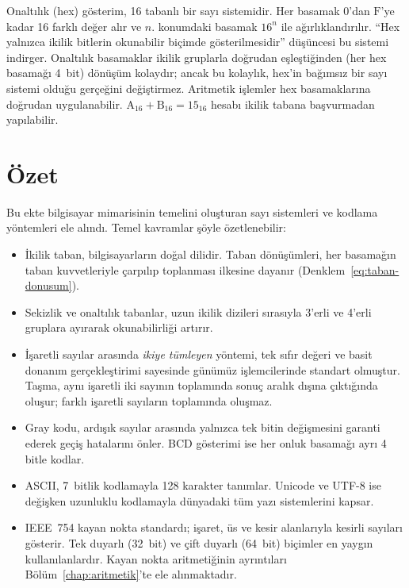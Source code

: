 Onaltılık (hex) gösterim, 16 tabanlı bir sayı sistemidir. Her basamak $0$'dan $\text{F}$'ye kadar 16 farklı değer alır ve $n$. konumdaki basamak $16^n$ ile ağırlıklandırılır. ``Hex yalnızca ikilik bitlerin okunabilir biçimde gösterilmesidir'' düşüncesi bu sistemi indirger. Onaltılık basamaklar ikilik gruplarla doğrudan eşleştiğinden (her hex basamağı 4~bit) dönüşüm kolaydır; ancak bu kolaylık, hex'in bağımsız bir sayı sistemi olduğu gerçeğini değiştirmez. Aritmetik işlemler hex basamaklarına doğrudan uygulanabilir. $\text{A}_{16} + \text{B}_{16} = \text{15}_{16}$ hesabı ikilik tabana başvurmadan yapılabilir.

\section*{Özet}

Bu ekte bilgisayar mimarisinin temelini oluşturan sayı sistemleri ve kodlama yöntemleri ele alındı. Temel kavramlar şöyle özetlenebilir:

\begin{itemize}
\item İkilik taban, bilgisayarların doğal dilidir. Taban dönüşümleri, her basamağın taban kuvvetleriyle çarpılıp toplanması ilkesine dayanır (Denklem~\ref{eq:taban-donusum}).

\item Sekizlik ve onaltılık tabanlar, uzun ikilik dizileri sırasıyla 3'erli ve 4'erli gruplara ayırarak okunabilirliği artırır.

\item İşaretli sayılar arasında \emph{ikiye tümleyen} yöntemi, tek sıfır değeri ve basit donanım gerçekleştirimi sayesinde günümüz işlemcilerinde standart olmuştur. Taşma, aynı işaretli iki sayının toplamında sonuç aralık dışına çıktığında oluşur; farklı işaretli sayıların toplamında oluşmaz.

\item Gray kodu, ardışık sayılar arasında yalnızca tek bitin değişmesini garanti ederek geçiş hatalarını önler. BCD gösterimi ise her onluk basamağı ayrı 4 bitle kodlar.

\item ASCII, 7~bitlik kodlamayla 128 karakter tanımlar. Unicode ve UTF-8 ise değişken uzunluklu kodlamayla dünyadaki tüm yazı sistemlerini kapsar.

\item IEEE~754 kayan nokta standardı; işaret, üs ve kesir alanlarıyla kesirli sayıları gösterir. Tek duyarlı (32~bit) ve çift duyarlı (64~bit) biçimler en yaygın kullanılanlardır. Kayan nokta aritmetiğinin ayrıntıları Bölüm~\ref{chap:aritmetik}'te ele alınmaktadır.
\end{itemize}


